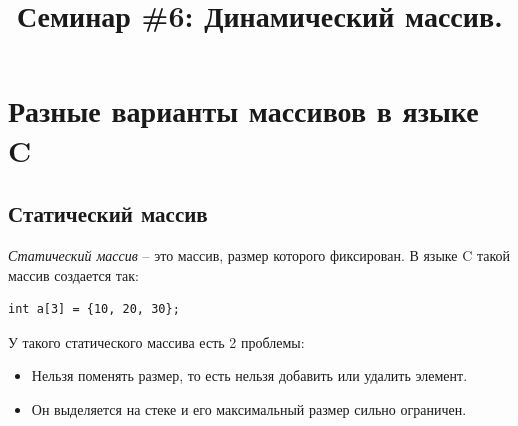 \documentclass[10pt]{article}
\begin{document}
\title{Семинар \#6: Динамический массив.\vspace{-5ex}}\date{}\maketitle

\section*{Разные варианты массивов в языке C}
\subsection*{Статический массив}
\begin{raggedleft}
\textit{Статический массив} -- это массив, размер которого фиксирован. В языке C такой массив создается так:
\end{raggedleft}
\begin{lstlisting}
int a[3] = {10, 20, 30};
\end{lstlisting}
У такого статического массива есть 2 проблемы:
\begin{itemize}
\item Нельзя поменять размер, то есть нельзя добавить или удалить элемент.
\item Он выделяется на стеке и его максимальный размер сильно ограничен.
\end{itemize}
\end{document}
